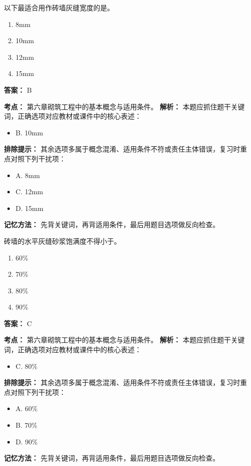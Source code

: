 \documentclass[UTF8,fontset=fandol,11pt]{ctexart}
\begin{document}
\vspace{0.2em}

\begin{quizbox}[title={第 16 题}]
以下最适合用作砖墙灰缝宽度的是。\\
\begin{enumerate}[label=\Alph*.]
\item 8mm
\item 10mm
\item 12mm
\item 15mm
\end{enumerate}
\textbf{答案：} B
\vspace{0.25em}
\begin{answerbox}[title={考点解析}]
\textbf{考点：} 第六章砌筑工程中的基本概念与适用条件。
\textbf{解析：} 本题应抓住题干关键词，正确选项对应教材或课件中的核心表述：
\begin{itemize}
\item B. 10mm
\end{itemize}
\textbf{排除提示：} 其余选项多属于概念混淆、适用条件不符或责任主体错误，复习时重点对照下列干扰项：
\begin{itemize}
\item A. 8mm
\item C. 12mm
\item D. 15mm
\end{itemize}
\textbf{记忆方法：} 先背关键词，再背适用条件，最后用题目选项做反向检查。
\end{answerbox}
\end{quizbox}

\vspace{0.2em}

\begin{quizbox}[title={第 17 题}]
砖墙的水平灰缝砂浆饱满度不得小于。\\
\begin{enumerate}[label=\Alph*.]
\item 60\%
\item 70\%
\item 80\%
\item 90\%
\end{enumerate}
\textbf{答案：} C
\vspace{0.25em}
\begin{answerbox}[title={考点解析}]
\textbf{考点：} 第六章砌筑工程中的基本概念与适用条件。
\textbf{解析：} 本题应抓住题干关键词，正确选项对应教材或课件中的核心表述：
\begin{itemize}
\item C. 80\%
\end{itemize}
\textbf{排除提示：} 其余选项多属于概念混淆、适用条件不符或责任主体错误，复习时重点对照下列干扰项：
\begin{itemize}
\item A. 60\%
\item B. 70\%
\item D. 90\%
\end{itemize}
\textbf{记忆方法：} 先背关键词，再背适用条件，最后用题目选项做反向检查。
\end{answerbox}
\end{quizbox}
\end{document}
